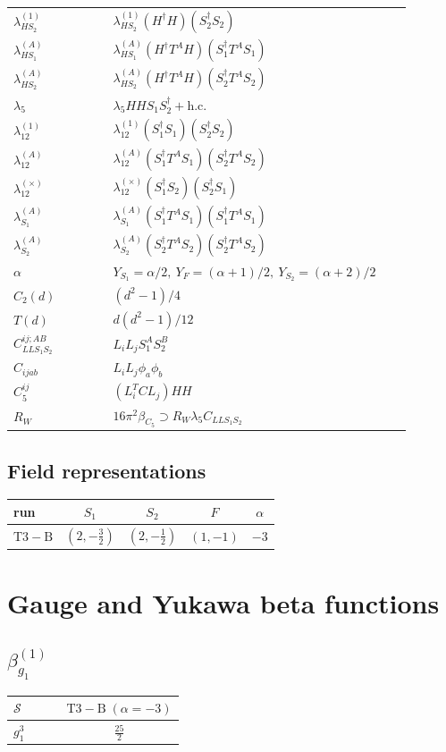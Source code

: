 \documentclass[9pt]{article}
\begin{document}
\begin{longtable}{@{}p{0.23\linewidth}p{0.69\linewidth}@{}}
$\lambda_{HS_2}^{(1)}$ & $\lambda_{HS_2}^{(1)}(H^\dagger H)(S_2^\dagger S_2)$ \\
$\lambda_{HS_1}^{(A)}$ & $\lambda_{HS_1}^{(A)}(H^\dagger T^AH)(S_1^\dagger T^AS_1)$ \\
$\lambda_{HS_2}^{(A)}$ & $\lambda_{HS_2}^{(A)}(H^\dagger T^AH)(S_2^\dagger T^AS_2)$ \\
$\lambda_5$ & $\lambda_5HHS_1S_2^\dagger+\mathrm{h.c.}$ \\
$\lambda_{12}^{(1)}$ & $\lambda_{12}^{(1)}(S_1^\dagger S_1)(S_2^\dagger S_2)$ \\
$\lambda_{12}^{(A)}$ & $\lambda_{12}^{(A)}(S_1^\dagger T^AS_1)(S_2^\dagger T^AS_2)$ \\
$\lambda_{12}^{(\times)}$ & $\lambda_{12}^{(\times)}(S_1^\dagger S_2)(S_2^\dagger S_1)$ \\
$\lambda_{S_1}^{(A)}$ & $\lambda_{S_1}^{(A)}(S_1^\dagger T^A S_1)(S_1^\dagger T^A S_1)$ \\
$\lambda_{S_2}^{(A)}$ & $\lambda_{S_2}^{(A)}(S_2^\dagger T^A S_2)(S_2^\dagger T^A S_2)$ \\
$\alpha$ & $Y_{S_1}=\alpha/2,\ Y_F=(\alpha+1)/2,\ Y_{S_2}=(\alpha+2)/2$ \\
$C_2(d)$ & $(d^2-1)/4$ \\
$T(d)$ & $d(d^2-1)/12$ \\
$C_{LLS_1S_2}^{ij;AB}$ & $L_iL_jS_1^AS_2^B$ \\
$C_{ijab}$ & $L_iL_j\phi_a\phi_b$ \\
$C_5^{ij}$ & $(L_i^TCL_j)HH$ \\
$R_W$ & $16\pi^2\beta_{C_5}\supset R_W\lambda_5C_{LLS_1S_2}$ \\
\bottomrule
\end{longtable}
\subsection*{Field representations}
\begin{longtable}{@{}lcccc@{}}
\toprule
run & $S_1$ & $S_2$ & $F$ & $\alpha$ \\
\midrule
$\mathrm{T3-B}$ & $(2,- \frac{3}{2})$ & $(2,- \frac{1}{2})$ & $(1,-1)$ & $-3$ \\
\bottomrule
\end{longtable}
\section*{Gauge and Yukawa beta functions}
\subsection*{$ \beta_{g_1}^{(1)} $}
\begin{longtable}{@{}p{0.38\linewidth}c@{}}
\toprule
$\mathcal{S}$ & $ \mathrm{T3-B}\;(\alpha=-3) $ \\
\midrule
$ g_1^3 $ & $ \frac{25}{2} $ \\
\bottomrule
\end{longtable}
\end{document}
